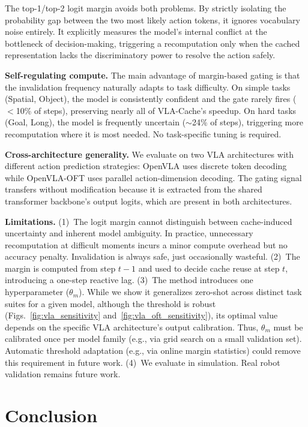 \documentclass[letterpaper, 10 pt, conference]{ieeeconf}  %
\begin{document}
The top-1/top-2 logit margin avoids both problems. By strictly isolating the probability gap between the two most likely action tokens, it ignores vocabulary noise entirely. It explicitly measures the model's internal conflict at the bottleneck of decision-making, triggering a recomputation only when the cached representation lacks the discriminatory power to resolve the action safely. 

\textbf{Self-regulating compute.}
The main advantage of margin-based gating is that the invalidation
frequency naturally adapts to task difficulty.
On simple tasks (Spatial, Object), the model is consistently confident
and the gate rarely fires ($<$10\% of steps), preserving nearly all of
VLA-Cache's speedup.
On hard tasks (Goal, Long), the model is frequently uncertain
($\sim$24\% of steps), triggering more recomputation where it is most
needed.
No task-specific tuning is required.

\textbf{Cross-architecture generality.}
We evaluate on two VLA architectures with different
action prediction strategies: OpenVLA uses discrete token
decoding while OpenVLA-OFT uses parallel action-dimension decoding.
The gating signal transfers without modification because it is
extracted from the shared transformer backbone's output logits,
which are present in both architectures.

\textbf{Limitations.}
(1)~The logit margin cannot distinguish between cache-induced
uncertainty and inherent model ambiguity.
In practice, unnecessary recomputation at difficult moments
incurs a minor compute overhead but no accuracy penalty. Invalidation
is always safe, just occasionally wasteful.
(2)~The margin is computed from step $t{-}1$ and used to
decide cache reuse at step $t$, introducing a one-step reactive lag.
(3)~The method introduces one hyperparameter ($\theta_m$).
While we show it generalizes zero-shot across distinct task suites
for a given model, although the threshold is robust (Figs.~\ref{fig:vla_sensitivity} and~\ref{fig:vla_oft_sensitivity}), its optimal value depends on the specific VLA
architecture's output calibration. Thus, $\theta_m$ must be calibrated
once per model family (e.g., via grid search on a small validation set).
Automatic threshold adaptation (e.g., via online margin statistics)
could remove this requirement in future work.
(4)~We evaluate in simulation. Real robot validation remains future work.


\section{Conclusion}\label{sec:conclusion}
\end{document}
